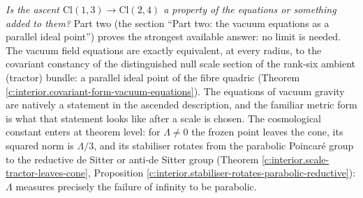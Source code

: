 \documentclass[11pt]{article}
\theoremstyle{definition}
\theoremstyle{plain}
\providecommand{\Cl}{}\renewcommand{\Cl}{\mathrm{Cl}}
\begin{document}
\emph{Is the ascent $\Cl(1,3) \to \Cl(2,4)$ a property of the equations or something added to them?} Part two (the section ``Part two: the vacuum equations as a parallel ideal point'') proves the strongest available answer: no limit is needed. The vacuum field equations are exactly equivalent, at every radius, to the covariant constancy of the distinguished null scale section of the rank-six ambient (tractor) bundle: a parallel ideal point of the fibre quadric (Theorem \ref{c:interior.covariant-form-vacuum-equations}). The equations of vacuum gravity are natively a statement in the ascended description, and the familiar metric form is what that statement looks like after a scale is chosen. The cosmological constant enters at theorem level: for $\Lambda \neq 0$ the frozen point leaves the cone, its squared norm is $\Lambda/3$, and its stabiliser rotates from the parabolic Poincar\'e group to the reductive de Sitter or anti-de Sitter group (Theorem \ref{c:interior.scale-tractor-leaves-cone}, Proposition \ref{c:interior.stabiliser-rotates-parabolic-reductive}): $\Lambda$ measures precisely the failure of infinity to be parabolic.
\end{document}
